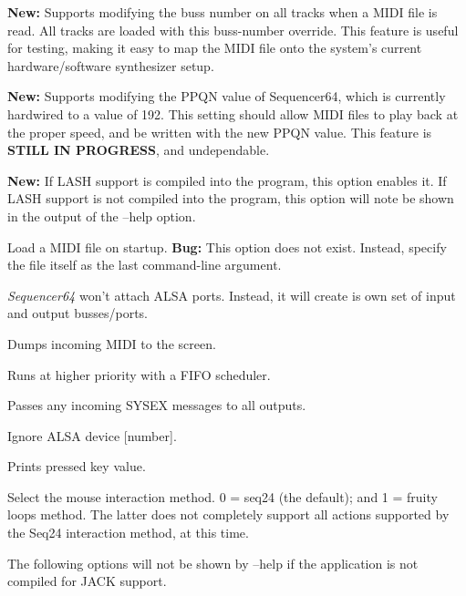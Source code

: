       \textbf{New:}
      Supports modifying the buss number on all tracks when a MIDI file is
      read.  All tracks are loaded with this buss-number override.  This
      feature is useful for testing, making it easy to map the MIDI file onto
      the system's current hardware/software synthesizer setup.

      \textbf{New:}
      Supports modifying the PPQN value of Sequencer64, which is currently
      hardwired to a value of 192.  This setting should allow MIDI files to
      play back at the proper speed, and be written with the new PPQN value.
      This feature is \textbf{STILL IN PROGRESS}, and undependable.

      \textbf{New:}
      If LASH support is compiled into the program, this option
      enables it.
      If LASH support is not compiled into the program, this option will note
      be shown in the output of the --help option.

      Load a MIDI file on startup.
      \textbf{Bug:}
      This option does not exist.
      Instead, specify the file itself as the last command-line argument.

      \textsl{Sequencer64} won't attach ALSA ports.
      Instead, it will create is own set of input and output busses/ports.

      Dumps incoming MIDI to the screen.

      Runs at higher priority with a FIFO scheduler.

      Passes any incoming SYSEX messages to all outputs.

      Ignore ALSA device [number].

      Prints pressed key value.

      Select the mouse interaction method.
      0 = seq24 (the default); and 1 = fruity loops method.
      The latter does not completely support all actions supported by the Seq24
      interaction method, at this time.

      The following options will not be shown by --help if the application is
      not compiled for JACK support.

